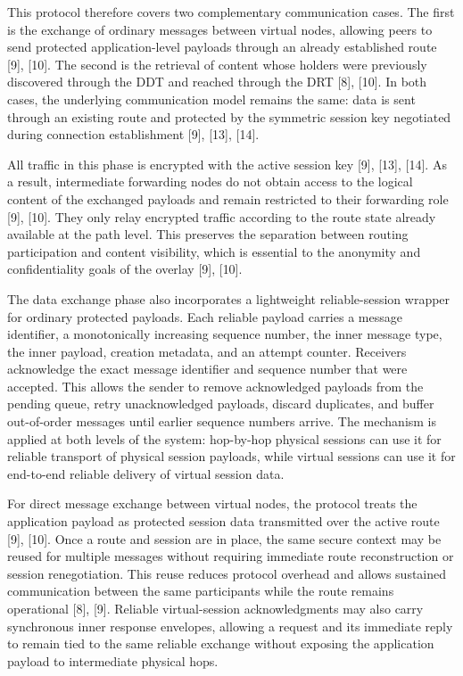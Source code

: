 \documentclass[12pt,a4paper]{article}
\begin{document}
This protocol therefore covers two complementary communication cases. The first is the exchange of ordinary messages between virtual nodes, allowing peers to send protected application-level payloads through an already established route [9], [10]. The second is the retrieval of content whose holders were previously discovered through the DDT and reached through the DRT [8], [10]. In both cases, the underlying communication model remains the same: data is sent through an existing route and protected by the symmetric session key negotiated during connection establishment [9], [13], [14].

All traffic in this phase is encrypted with the active session key [9], [13], [14]. As a result, intermediate forwarding nodes do not obtain access to the logical content of the exchanged payloads and remain restricted to their forwarding role [9], [10]. They only relay encrypted traffic according to the route state already available at the path level. This preserves the separation between routing participation and content visibility, which is essential to the anonymity and confidentiality goals of the overlay [9], [10].

The data exchange phase also incorporates a lightweight reliable-session wrapper for ordinary protected payloads. Each reliable payload carries a message identifier, a monotonically increasing sequence number, the inner message type, the inner payload, creation metadata, and an attempt counter. Receivers acknowledge the exact message identifier and sequence number that were accepted. This allows the sender to remove acknowledged payloads from the pending queue, retry unacknowledged payloads, discard duplicates, and buffer out-of-order messages until earlier sequence numbers arrive. The mechanism is applied at both levels of the system: hop-by-hop physical sessions can use it for reliable transport of physical session payloads, while virtual sessions can use it for end-to-end reliable delivery of virtual session data.

For direct message exchange between virtual nodes, the protocol treats the application payload as protected session data transmitted over the active route [9], [10]. Once a route and session are in place, the same secure context may be reused for multiple messages without requiring immediate route reconstruction or session renegotiation. This reuse reduces protocol overhead and allows sustained communication between the same participants while the route remains operational [8], [9]. Reliable virtual-session acknowledgments may also carry synchronous inner response envelopes, allowing a request and its immediate reply to remain tied to the same reliable exchange without exposing the application payload to intermediate physical hops.
\end{document}
